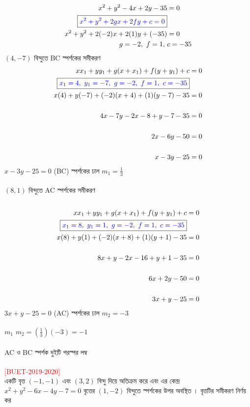 \documentclass{article}
\begin{document}
	\begin{align*}
		x^2+y^2-4x+2y-35&=0\\
		\boxed{\textcolor{blue}{x^2+y^2+2gx+2fy+c=0}}&\\
		x^2+y^2+2(-2)x+2(1)y+(-35)&=0\\
		g=-2,\,\,f=1,\,\,&c=-35\\
	\end{align*}
$(4,-7)$ বিন্দুতে BC স্পর্শকের সমীকরণ \\
	\begin{align*}
		xx_1+yy_1+g(x+x_1)+f(y+y_1)+c&=0\\
		\boxed{\textcolor{blue}{x_1=4,\,\,y_1=-7,\,\,g=-2,\,\,f=1,\,\,c=-35}}&\\
		x(4)+y(-7)+(-2)(x+4)+(1)(y-7)-35&=0\\
		\\
		4x-7y-2x-8+y-7-35&=0\\
		\\
		2x-6y-50&=0\\
		\\
		x-3y-25&=0\\
	\end{align*}
$x-3y-25=0$ (BC) স্পর্শকের ঢাল $m_1=\frac{1}{3}$\\
\\ 
$(8,1)$ বিন্দুতে AC স্পর্শকের সমীকরণ \\
\\ 
	\begin{align*}
		xx_1+yy_1+g(x+x_1)+f(y+y_1)+c&=0\\
		\boxed{\textcolor{blue}{x_1=8,\,\,y_1=1,\,\,g=-2,\,\,f=1,\,\,c=-35}}&\\
		x(8)+y(1)+(-2)(x+8)+(1)(y+1)-35&=0\\
		\\
		8x+y-2x-16+y+1-35&=0\\
		\\
		6x+2y-50&=0\\
		\\
		3x+y-25&=0\\
	\end{align*}
	$3x+y-25=0$ (AC) স্পর্শকের ঢাল $m_2=-3$\\
	\\
	$m_1\,\,m_2=\left(\frac{1}{3}\right)(-3)=-1$\\
	\\
AC ও BC	স্পর্শক দুইটি পরস্পর লম্ব \\
	\\ 
	\textcolor{red}{[BUET-2019-2020]}\\
	একটি বৃত্ত $(-1,-1)$ এবং $(3,2)$ বিন্দু দিয়ে অতিক্রম করে এবং এর কেন্দ্র $x^2+y^2-6x-4y-7=0$ বৃত্তের $(1,-2)$ বিন্দুতে স্পর্শকের উপর অবস্থিত । বৃত্তটির সমীকরণ নির্ণয় কর \\ 
\end{document}
